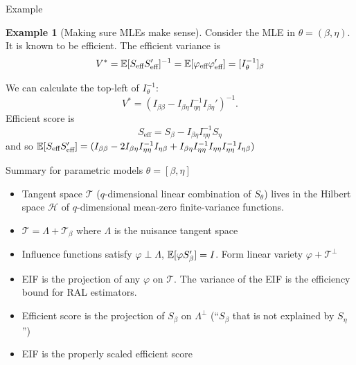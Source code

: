 \documentclass[10pt,aspectratio=169,handout]{beamer}
\theoremstyle{definition}
\newtheorem{ex}{Example}
\begin{document}
\begin{frame}{Example}
\begin{ex}[Making sure MLEs make sense]
    Consider the MLE in $\theta = (\beta, \eta).$ It is known to be
    efficient. The efficient variance is \[
    V^* = \mathbb{E}[S_\text{eff} S_\text{eff}']^{-1} = \mathbb{E}[\varphi_
    \text{eff}\varphi_\text{eff}'] = [I_\theta^{-1}]_{\beta}
    \]
    
    We can calculate the top-left of $I_\theta^{-1}$: \[
    V^* = (I_{\beta\beta} - I_{\beta\eta}I_{\eta\eta}^{-1} I_{\beta\eta}')^
    {-1}.
    \]
    Efficient score is \[
    S_{\text{eff}}= S_\beta - I_{\beta\eta} I_{\eta\eta}^{-1} S_\eta
    \]
    and so $\mathbb{E}[S_\text{eff} S_\text{eff}'] = (I_{\beta\beta} - 2 I_
    {\beta\eta}I_{\eta\eta}^{-1} I_{\eta\beta} + I_{\beta\eta} I_
    {\eta\eta}^{-1} I_{\eta\eta} I_{\eta\eta}^{-1} I_{\eta\beta})$
  \end{ex} 
\end{frame}

\begin{frame}{Summary for parametric models}
$\theta = [\beta,\eta]$
  \begin{itemize}
    \item Tangent space $\mathcal T$ ($q$-dimensional linear combination of
    $S_\theta$) lives in the Hilbert space $\mathcal H$ of $q$-dimensional
    mean-zero
    finite-variance functions.
    \item $\mathcal T = \Lambda + \mathcal T_\beta$ where $\Lambda$ is the
    nuisance tangent space
    \item Influence functions satisfy $\varphi \perp \Lambda$, $\mathbb{E}
    [\varphi S_\beta'] = I$. Form linear variety $\varphi + \mathcal
    T^\perp$
    \item EIF is the projection of any $\varphi$ on $\mathcal T$. The
    variance of the EIF is the efficiency bound for RAL estimators.
    \item Efficient score is the projection of $S_\beta$ on $\Lambda^\perp$ (``$S_\beta$ that is not explained by $S_\eta$'')
    \item EIF is the properly scaled efficient score
  \end{itemize}
\end{frame}
\end{document}
